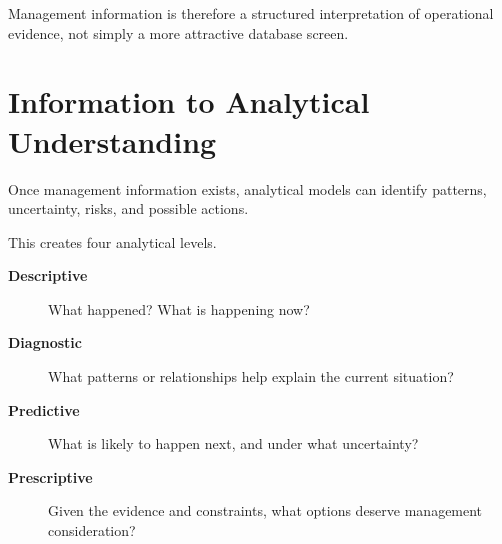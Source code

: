 \documentclass[11pt,a4paper]{article}
\begin{document}
Management information is therefore a structured interpretation of operational
evidence, not simply a more attractive database screen.

\section{Information to Analytical Understanding}

Once management information exists, analytical models can identify patterns,
uncertainty, risks, and possible actions.

\begin{center}
\end{center}

This creates four analytical levels.

\begin{description}
\item[\textbf{Descriptive}] What happened? What is happening now?
\item[\textbf{Diagnostic}] What patterns or relationships help explain the
current situation?
\item[\textbf{Predictive}] What is likely to happen next, and under what
uncertainty?
\item[\textbf{Prescriptive}] Given the evidence and constraints, what options
deserve management consideration?
\end{description}
\end{document}
